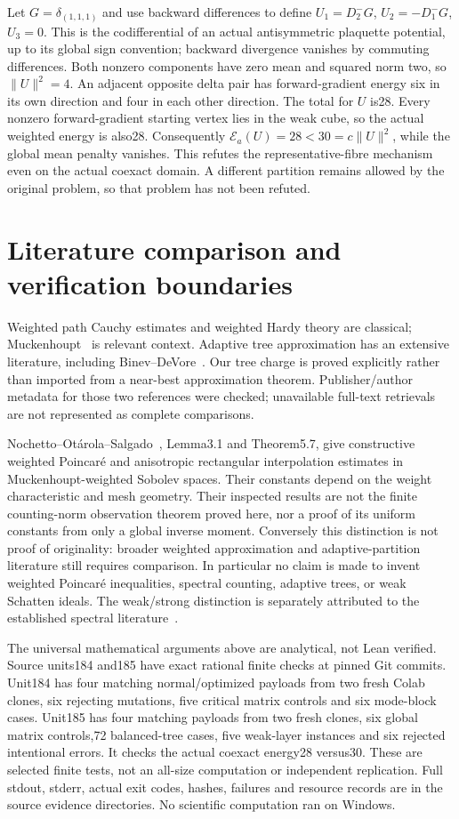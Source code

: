 \documentclass[11pt]{article}
\newcommand{\E}{\mathcal E}
\begin{document}
Let $G=\delta_{(1,1,1)}$ and use backward differences to define
$U_1=D_2^-G$, $U_2=-D_1^-G$, $U_3=0$. This is the codifferential of
an actual antisymmetric plaquette potential, up to its global sign
convention; backward divergence vanishes by commuting differences.
Both nonzero components have zero mean and squared norm two, so
$\|U\|^2=4$. An adjacent opposite delta pair has forward-gradient
energy six in its own direction and four in each other direction.
The total for $U$ is28. Every nonzero forward-gradient starting vertex
lies in the weak cube, so the actual weighted energy is also28.
Consequently $\E_a(U)=28<30=c\|U\|^2$, while the global mean penalty
vanishes. This refutes the representative-fibre mechanism even on the
actual coexact domain. A different partition remains allowed by the
original problem, so that problem has not been refuted.

\section{Literature comparison and verification boundaries}
Weighted path Cauchy estimates and weighted Hardy theory are classical;
Muckenhoupt~\cite{muckenhoupt} is relevant context. Adaptive tree
approximation has an extensive literature, including
Binev--DeVore~\cite{binev}. Our tree charge is proved explicitly rather
than imported from a near-best approximation theorem. Publisher/author
metadata for those two references were checked; unavailable full-text
retrievals are not represented as complete comparisons.

Nochetto--Ot\'arola--Salgado~\cite{nos}, Lemma3.1 and Theorem5.7,
give constructive weighted Poincar\'e and anisotropic rectangular
interpolation estimates in Muckenhoupt-weighted Sobolev spaces.
Their constants depend on the weight characteristic and mesh geometry.
Their inspected results are not the finite counting-norm observation
theorem proved here, nor a proof of its uniform constants from only a
global inverse moment. Conversely this distinction is not proof of
originality: broader weighted approximation and adaptive-partition
literature still requires comparison. In particular no claim is made to
invent weighted Poincar\'e inequalities, spectral counting, adaptive trees,
or weak Schatten ideals. The weak/strong distinction is separately
attributed to the established spectral literature~\cite{frank}.

The universal mathematical arguments above are analytical, not Lean
verified. Source units184 and185 have exact rational finite checks at
pinned Git commits. Unit184 has four matching normal/optimized payloads
from two fresh Colab clones, six rejecting mutations, five critical matrix
controls and six mode-block cases. Unit185 has four matching payloads
from two fresh clones, six global matrix controls,72 balanced-tree cases,
five weak-layer instances and six rejected intentional errors. It checks
the actual coexact energy28 versus30. These are selected finite tests,
not an all-size computation or independent replication. Full stdout,
stderr, actual exit codes, hashes, failures and resource records are in
the source evidence directories. No scientific computation ran on Windows.
\end{document}
